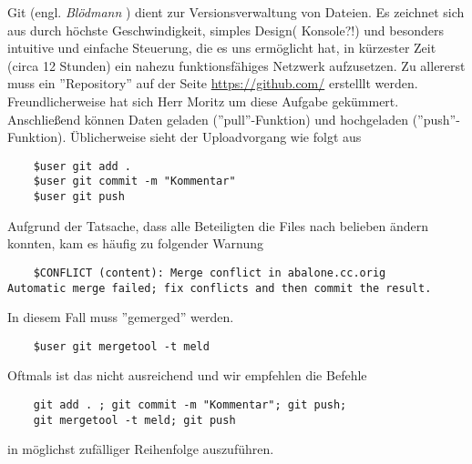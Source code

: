 Git (engl. \textit{Blödmann} ) dient zur Versionsverwaltung von Dateien.
Es zeichnet sich aus durch höchste Geschwindigkeit, simples Design( Konsole?!) und
besonders intuitive und einfache Steuerung, die es uns ermöglicht hat, in kürzester Zeit (circa 12 Stunden) 
ein nahezu funktionsfähiges Netzwerk aufzusetzen.
Zu allererst muss ein ''Repository'' auf der Seite \url{https://github.com/} erstelllt werden. 
Freundlicherweise hat sich Herr Moritz um diese Aufgabe gekümmert.
Anschließend können Daten geladen (''pull''-Funktion) und hochgeladen (''push''-Funktion).
Üblicherweise sieht der Uploadvorgang wie folgt aus
\begin{verbatim}
	$user git add .
	$user git commit -m "Kommentar"
	$user git push
\end{verbatim}

Aufgrund der Tatsache, dass alle Beteiligten die Files nach belieben ändern konnten, kam es häufig zu 
folgender Warnung
\begin{verbatim}
	$CONFLICT (content): Merge conflict in abalone.cc.orig
Automatic merge failed; fix conflicts and then commit the result.
\end{verbatim}
In diesem Fall muss ''gemerged'' werden.
\begin{verbatim}
	$user git mergetool -t meld
\end{verbatim}
Oftmals ist das nicht ausreichend und wir empfehlen die Befehle
\begin{verbatim}
	git add . ; git commit -m "Kommentar"; git push;
	git mergetool -t meld; git push
\end{verbatim}
in möglichst zufälliger Reihenfolge auszuführen.
